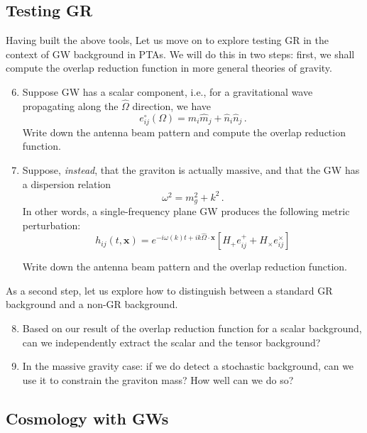 \documentclass[article, onecolumn, ,nofootinbib,nopreprintnumbers]{revtex4}
\begin{document}
\subsection{Testing GR}

Having built the above tools, Let us move on to explore testing GR in the context of GW background in PTAs.  We will do this in two steps: first, we shall compute the overlap reduction function in more general theories of gravity.  
\begin{enumerate}
\setcounter{enumi}{5}
\item Suppose GW has a scalar component, i.e., for a gravitational wave propagating along the $\hat\Omega$ direction, we have 
\begin{equation}
e^{\circ}_{ij}(\Omega)=\hat m_i\hat m_j+\hat n_i \hat n_j\,.
\end{equation}
Write down the antenna beam pattern and compute the overlap reduction function.  
\item Suppose, {\it instead}, that the graviton is actually massive, and that the GW has a dispersion relation 
\begin{equation}
\omega^2 = m_g^2 +k^2\,.
\end{equation}
In other words, a single-frequency plane GW produces the following metric perturbation: 
\begin{equation}
h_{ij} (t,\mathbf{x}) = e^{-i\omega(k) t+ i k\hat\Omega\cdot\mathbf{x}} \left[
H_+ e^{+}_{ij} +
H_\times e^{\times}_{ij}\right]
\end{equation}

Write down the antenna beam pattern and the overlap reduction function. 
\end{enumerate}
As a second step, let us explore how to distinguish between a standard GR background and a non-GR background. 
\begin{enumerate}
\setcounter{enumi}{7}
\item Based on our result of the overlap reduction function for a scalar background, can we independently extract the scalar and the tensor background?  
\item In the massive gravity case: if we do detect a stochastic background, can we use it to constrain the graviton mass?  How well can we do so?
\end{enumerate}

\subsection{Cosmology with GWs}
\end{document}
